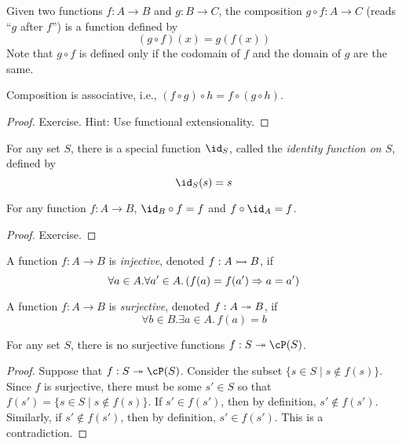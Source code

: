 \documentclass{amsart}
\begin{document}
\begin{defn}
  Given two functions $f : A \to B$ and $g : B \to C$, the composition $g \circ f : A \to C$ (reads ``$g$ after $f$'') is a function defined by
  \[
    (g \circ f)(x) = g(f(x))
  \]
  Note that $g \circ f$ is defined only if the codomain of $f$ and the domain of $g$ are the same.
\end{defn}

\begin{lem}
  Composition is associative, i.e., $(f \circ g) \circ h = f \circ (g \circ h)$.
\end{lem}
\begin{proof}
  Exercise.
  Hint: Use functional extensionality.
\end{proof}

\begin{defn}
  For any set $S$, there is a special function $\id_{S}$, called the \emph{identity function on $S$}, defined by
  \[
    \id_{S}(s) = s
  \]
\end{defn}

\begin{lem}
  For any function $f : A \to B$, $\id_{B} \circ f = f$ and $f \circ \id_{A} = f$.
\end{lem}
\begin{proof}
  Exercise.
\end{proof}

\begin{defn}
  A function $f : A \to B$ is \emph{injective}, denoted $f : A \rightarrowtail B$, if
  \[
    \forall a \in A.\forall a' \in A.\,(f(a) = f(a') \Rightarrow a = a')
  \]
\end{defn}

\begin{defn}
  A function $f : A \to B$ is \emph{surjective}, denoted $f : A \twoheadrightarrow B$, if
  \[
    \forall b \in B.\exists a \in A.\,f(a) = b
  \]
\end{defn}

\begin{thm}
  For any set $S$, there is no surjective functions $f : S \epi \cP(S)$.
\end{thm}
\begin{proof}
  Suppose that $f : S \epi \cP(S)$.
  Consider the subset $\{s \in S \mid s \notin f(s)\}$.
  Since $f$ is surjective, there must be some $s' \in S$ so that $f(s') = \{s \in S \mid s \notin f(s)\}$.
  If $s' \in f(s')$, then by definition, $s' \notin f(s')$.
  Similarly, if $s' \notin f(s')$, then by definition, $s' \in f(s')$.
  This is a contradiction.
\end{proof}
\end{document}
